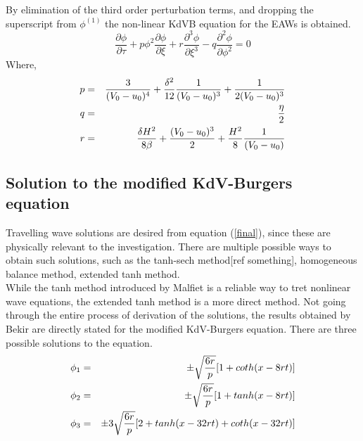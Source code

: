 \documentclass[a4paper, 12pt]{article}
\begin{document}
\newline
By elimination of the third order perturbation terms, and dropping the superscript from $\phi^{(1)}$ the non-linear KdVB equation for the EAWs is obtained.
\begin{equation}\label{final}
    \frac{\partial \phi}{\partial\tau} + p \phi^2 \frac{\partial\phi}{\partial \xi} + r \frac{\partial^3 \phi}{\partial \xi^3} - q \frac{\partial^2 \phi}{\partial \phi^2} = 0
\end{equation}
Where,
\begin{eqnarray}
    p &=& \frac{3}{(V_0 - u_0)^4} + \frac{\delta^2}{12} \frac{1}{(V_0 - u_0)^3} + \frac{1}{2(V_0 - u_0)^3} \notag \\
    q &=& \frac{\eta}{2} \notag \\
    r &=& \frac{\delta H^2}{8 \beta} + \frac{(V_0 - u_0)^3}{2} + \frac{H^2}{8} \frac{1}{(V_0 - u_0)} \notag
\end{eqnarray}

\subsection{Solution to the modified KdV-Burgers equation}
Travelling wave solutions are desired from equation (\ref{final}), since these are physically relevant to the investigation.
There are multiple possible ways to obtain such solutions, such as the tanh-sech method[ref something], homogeneous balance method\cite{fan-zhang}, extended tanh method\cite{wazwaz2008}.\\
\indent While the tanh method introduced by Malfiet\cite{malfliet-hereman} is a reliable way to tret nonlinear wave equations, the extended tanh method is a more direct method.
Not going through the entire process of derivation of the solutions, the results obtained by Bekir\cite{bekir} are directly stated for the modified KdV-Burgers equation.
There are three possible solutions to the equation.
\begin{eqnarray}
    \phi_1 &=& \pm \sqrt{\frac{6r}{p}}[ 1 + coth(x - 8rt)] \notag \\
    \phi_2 &=& \pm \sqrt{\frac{6r}{p}}[ 1 + tanh(x - 8rt)] \notag \\
    \phi_3 &=& \pm 3\sqrt{\frac{6r}{p}}[ 2 + tanh(x - 32rt) + coth(x - 32rt)] \notag
\end{eqnarray}
\end{document}
